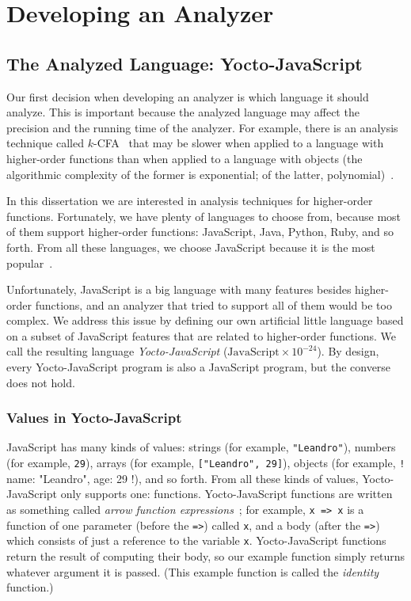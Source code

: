 \documentclass[12pt, oneside]{book}
\begin{document}
\chapter{Developing an Analyzer}


\section{The Analyzed Language: Yocto-JavaScript}
\label{The Analyzed Language: Yocto-JavaScript}

Our first decision when developing an analyzer is which language it should analyze. This is important because the analyzed language may affect the precision and the running time of the analyzer. For example, there is an analysis technique called $k$-CFA~\cite{k-cfa} that may be slower when applied to a language with higher-order functions than when applied to a language with objects (the algorithmic complexity of the former is exponential; of the latter, polynomial)~\cite{m-cfa}.

In this dissertation we are interested in analysis techniques for higher-order functions. Fortunately, we have plenty of languages to choose from, because most of them support higher-order functions: JavaScript, Java, Python, Ruby, and so forth. From all these languages, we choose JavaScript because it is the most popular~\cite{stack-overflow-developer-survey, jet-brains-developer-survey}.

Unfortunately, JavaScript is a big language with many features besides higher-order functions, and an analyzer that tried to support all of them would be too complex. We address this issue by defining our own artificial little language based on a subset of JavaScript features that are related to higher-order functions. We call the resulting language \emph{Yocto-JavaScript} ($\mathrm{JavaScript} \times 10^{-24}$). By design, every Yocto-JavaScript program is also a JavaScript program, but the converse does not hold.

\subsection{Values in Yocto-JavaScript}
\label{Values in Yocto-JavaScript}

JavaScript has many kinds of values: strings (for example, \texttt{"Leandro"}), numbers (for example, \texttt{29}), arrays (for example, \texttt{["Leandro", 29]}), objects (for example, \texttt!{ name: "Leandro", age: 29 }!), and so forth. From all these kinds of values, Yocto-JavaScript only supports one: functions. Yocto-JavaScript functions are written as something called \emph{arrow function expressions}~\cite{arrow-function-expressions}; for example, \texttt{x => x} is a function of one parameter (before the \texttt{=>}) called \texttt{x}, and a body (after the \texttt{=>}) which consists of just a reference to the variable \texttt{x}. Yocto-JavaScript functions return the result of computing their body, so our example function simply returns whatever argument it is passed. (This example function is called the \emph{identity} function.)
\end{document}
